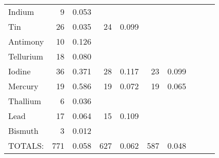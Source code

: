 \begin{table}
\begin{center}
\begin{tabular}{lrrrrrrrrr}
Indium     &       9 &    0.053 &         &          &         &          &   \\
Tin        &      26 &    0.035 &      24 &    0.099 &         &          &   \\
Antimony   &      10 &    0.126 &         &          &         &          &   \\
Tellurium  &      18 &    0.080 &         &          &         &          &   \\
Iodine     &      36 &    0.371 &      28 &    0.117 &      23 &    0.099 &  \\
Mercury    &      19 &    0.586 &      19 &    0.072 &      19 &    0.065 &  \\
Thallium   &       6 &    0.036 &         &          &         &          &   \\
Lead       &      17 &    0.064 &      15 &    0.109 &         &          &   \\
Bismuth    &       3 &    0.012 &         &          &         &          &   \\ \hline
 TOTALS:   &     771 &    0.058 &     627 &    0.062 &     587 &    0.048 &  \\ \hline
\end{tabular}
\end{center}
\end{table}

